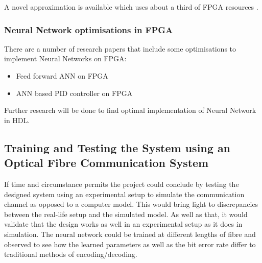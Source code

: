 A novel approximation is available which uses about a third of FPGA resources \autocite{9027479}.

\subsubsection{Neural Network optimisations in FPGA} 
There are a number of research papers that include some optimisations to implement Neural Networks on FPGA: 
\begin{itemize}
	\item Feed forward ANN on FPGA \autocite{7011454}
	\item ANN based PID controller on FPGA \autocite{5328349}
\end{itemize}
Further research will be done to find optimal implementation of Neural Network in HDL.

\subsection{Training and Testing the System using an Optical Fibre Communication System}

If time and circumstance permits the project could conclude by testing the designed system using an experimental setup to simulate the communication channel as opposed to a computer model. This would bring light to discrepancies between the real-life setup and the simulated model. As well as that, it would validate that the design works as well in an experimental setup as it does in simulation. The neural network could be trained at different lengths of fibre and observed to see how the learned parameters as well as the bit error rate differ to traditional methods of encoding/decoding. 
